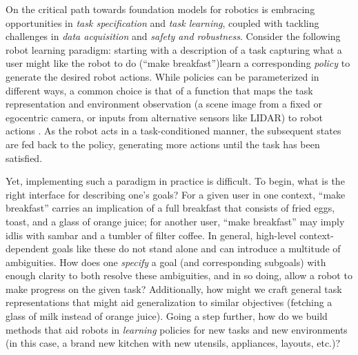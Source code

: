 On the critical path towards foundation models for robotics is embracing opportunities in \textit{task specification} and \textit{task learning}, coupled with tackling challenges in \textit{data acquisition} and \textit{safety and robustness}. Consider the following robot learning paradigm: starting with a description of a task capturing what a user might like the robot to do (\eg ``make breakfast'')\dash{}learn a corresponding \textit{policy} to generate the desired robot actions. While policies can be parameterized in different ways, a common choice is that of a function that maps the task representation and environment observation (\eg a scene image from a fixed or egocentric camera, or inputs from alternative sensors like LIDAR) to robot actions \citep{andrychowicz2017hindsight, nair2018rig}. As the robot acts in a task-conditioned manner, the subsequent states are fed back to the policy, generating more actions until the task has been satisfied.

Yet, implementing such a paradigm in practice is difficult. To begin, what is the right interface for describing one's goals? For a given user in one context, ``make breakfast'' carries an implication of a full breakfast that consists of fried eggs, toast, and a glass of orange juice; for another user, ``make breakfast'' may imply idlis with sambar and a tumbler of filter coffee. In general, high-level context-dependent goals like these do not stand alone and can introduce a multitude of ambiguities. How does one \textit{specify} a goal (and corresponding subgoals) with enough clarity to both resolve these ambiguities, and in so doing, allow a robot to make progress on the given task? Additionally, how might we craft general task representations that might aid generalization to similar objectives (\eg fetching a glass of milk instead of orange juice). Going a step further, how do we build methods that aid robots in \textit{learning} policies for new tasks and new environments (in this case, a brand new kitchen with new utensils, appliances, layouts, etc.)?

